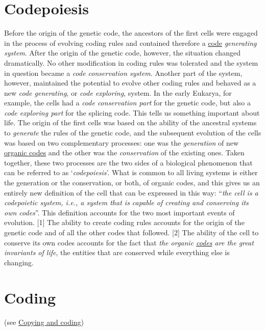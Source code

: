 \documentclass[12pt]{article}
\begin{document}
\section{Codepoiesis}
Before the origin of the genetic code, the ancestors of the first cells were engaged in the process of evolving coding rules and contained therefore a \hyperlink{code}{code} \textit{generating system}. After the origin of the genetic code, however, the situation changed dramatically. No other modification in coding rules was tolerated and the system in question became a \textit{code conservation system}. Another part of the system, however, maintained the potential to evolve other coding rules and behaved as a new \textit{code generating}, or \textit{code exploring}, system. In the early Eukarya, for example, the cells had a \textit{code conservation part} for the genetic code, but also a \textit{code exploring part} for the splicing code. This tells us something important about life. The origin of the first cells was based on the ability of the ancestral systems to \textit{generate} the rules of the genetic code, and the subsequent evolution of the cells was based on two complementary processes: one was the \textit{generation} of new \hyperlink{organic_codes}{organic codes} and the other was the \textit{conservation} of the existing ones. Taken together, these two processes are the two sides of a biological phenomenon that can be referred to as `\textit{codepoiesis}'. What is common to all living systems is either the generation or the conservation, or both, of organic codes, and this gives us an entirely new definition of the cell that can be expressed in this way: ``\textit{the cell is a codepoietic system, i.e., a system that is capable of creating and conserving its own codes}''. This definition accounts for the two most important events of evolution. [1] The ability to create coding rules accounts for the origin of the genetic code and of all the other codes that followed. [2] The ability of the cell to conserve its own codes accounts for the fact that \textit{the organic \hyperlink{code}{codes} are the great invariants of life}, the entities that are conserved while everything else is changing. 


\hypertarget{coding}{}
\section{Coding} (see \hyperlink{copying_and_coding}{Copying and coding})


\hypertarget{coding_semiosis}{}
\end{document}
